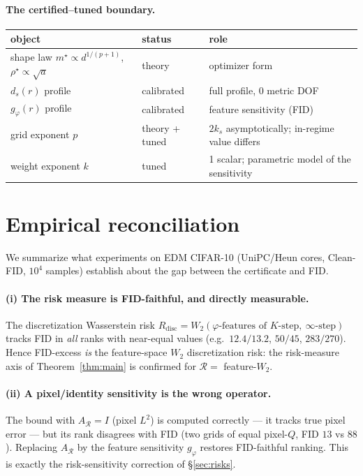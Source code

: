 \documentclass[11pt]{article}
\newcommand{\R}{\mathcal R}
\begin{document}
\paragraph{The certified--tuned boundary.}
\begin{center}
\small
\begin{tabular}{lll}
\toprule
object & status & role \\
\midrule
shape law $m^\star\propto d^{1/(p+1)}$, $\rho^\star\propto\sqrt a$ & theory & optimizer form \\
$d_s(r)$ profile & calibrated & full profile, 0 metric DOF \\
$g_\varphi(r)$ profile & calibrated & feature sensitivity (FID) \\
grid exponent $p$ & theory + tuned & $2k_s$ asymptotically; in-regime value differs \\
weight exponent $k$ & tuned & 1 scalar; parametric model of the sensitivity \\
\bottomrule
\end{tabular}
\end{center}

\section{Empirical reconciliation}
\label{sec:empirics}

We summarize what experiments on EDM CIFAR-10 (UniPC/Heun cores, Clean-FID,
$10^4$ samples) establish about the gap between the certificate and FID.

\paragraph{(i) The risk measure is FID-faithful, and directly measurable.}
The discretization Wasserstein risk
$R_{\mathrm{disc}}=W_2(\varphi\text{-features of }K\text{-step},\ \infty\text{-step})$
tracks FID in \emph{all} ranks with near-equal values (e.g.\ $12.4/13.2$,
$50/45$, $283/270$). Hence FID-excess \emph{is} the feature-space $W_2$
discretization risk: the risk-measure axis of Theorem~\ref{thm:main} is
confirmed for $\R=$ feature-$W_2$.

\paragraph{(ii) A pixel/identity sensitivity is the wrong operator.}
The bound with $A_\R=I$ (pixel $L^2$) is computed correctly --- it tracks
true pixel error --- but its rank disagrees with FID (two grids of equal
pixel-$Q$, FID $13$ vs $88$). Replacing $A_\R$ by the feature sensitivity
$g_\varphi$ restores FID-faithful ranking. This is exactly the
risk-sensitivity correction of \S\ref{sec:risks}.
\end{document}
